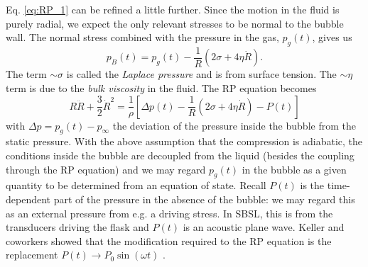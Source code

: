 \documentclass[11pt,prb,aps,nofootinbib,superscriptaddress,floatfix]{revtex4-2}
\begin{document}
Eq. \ref{eq:RP_1} can be refined a little further. Since the motion in the fluid is purely radial, we expect the only relevant stresses to be normal to the bubble wall. The normal stress combined with the pressure in the gas, $p_g(t)$, gives us \cite{brenner2002single,leighton2007derivation,prosperetti1999old,prosperetti1986bubble}
\begin{equation}
    p_B(t)=p_g(t)-\frac{1}{R}\left( 2\sigma+4\eta \dot{R} \right)
    \label{eq:p_B}.
\end{equation}
The term $\sim\sigma$ is called the \emph{Laplace pressure} and is from surface tension. The $\sim\eta$ term is due to the \emph{bulk viscosity} in the fluid. The RP equation becomes
\begin{equation}
    R\ddot{R}+\frac{3}{2}\dot{R}^2 = \frac{1}{\rho} \left[ \Delta p(t)-\frac{1}{R}\left( 2\sigma+4\eta \dot{R} \right)-P(t) \right]
    \label{eq:RP_2}
\end{equation}
with $\Delta p = p_g(t)-p_\infty$ the deviation of the pressure inside the bubble from the static pressure. With the above assumption that the compression is adiabatic, the conditions inside the bubble are decoupled from the liquid (besides the coupling through the RP equation) and we may regard $p_g(t)$ in the bubble as a given quantity to be determined from an equation of state. Recall $P(t)$ is the time-dependent part of the pressure in the absence of the bubble: we may regard this as an external pressure from e.g. a driving stress. In SBSL, this is from the transducers driving the flask and $P(t)$ is an acoustic plane wave. Keller and coworkers showed that the modification required to the RP equation is the replacement $P(t) \rightarrow P_0 \sin(\omega t)$ \cite{keller1980bubble}.

\end{document}
